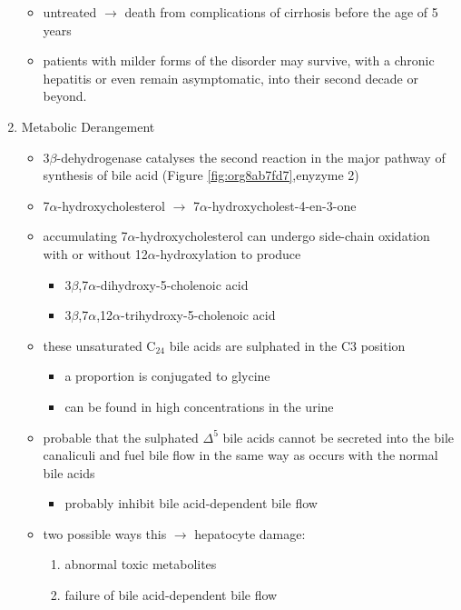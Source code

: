 \documentclass{scrartcl}
\begin{document}
\begin{enumerate}
\begin{itemize}
\item untreated \(\to\) death from complications of cirrhosis before the age
of 5 years
\item patients with milder forms of the disorder may survive, with a
chronic hepatitis or even remain asymptomatic, into their second
decade or beyond.
\end{itemize}
\item Metabolic Derangement
\label{sec:org27fbb07}
\begin{itemize}
\item 3\(\beta\)-dehydrogenase catalyses the second reaction in the major
pathway of synthesis of bile acid (Figure \ref{fig:org8ab7fd7},enyzyme 2)
\item 7\(\alpha\)-hydroxycholesterol \(\to\) 7\(\alpha\)-hydroxycholest-4-en-3-one
\item accumulating 7\(\alpha\)-hydroxycholesterol can undergo side-chain
oxidation with or without 12\(\alpha\)-hydroxylation to produce
\begin{itemize}
\item 3\(\beta\),7\(\alpha\)-dihydroxy-5-cholenoic acid
\item 3\(\beta\),7\(\alpha\),12\(\alpha\)-trihydroxy-5-cholenoic acid
\end{itemize}
\item these unsaturated C\(_{\text{24}}\) bile acids are sulphated in the C3 position
\begin{itemize}
\item a proportion is conjugated to glycine
\item can be found in high concentrations in the urine
\end{itemize}
\item probable that the sulphated \(\Delta^{\text{5}}\) bile acids cannot be secreted
into the bile canaliculi and fuel bile flow in the same way as
occurs with the normal bile acids
\begin{itemize}
\item probably inhibit bile acid-dependent bile flow
\end{itemize}
\item two possible ways this \(\to\) hepatocyte damage:
\begin{enumerate}
\item abnormal toxic metabolites
\item failure of bile acid-dependent bile flow
\end{enumerate}
\end{itemize}


\end{enumerate}
\end{document}
